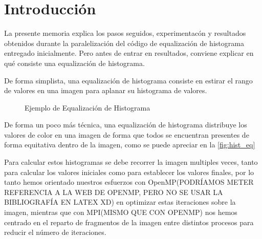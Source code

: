 \documentclass[12pt]{report} %
\begin{document}
\listoftables
\thispagestyle{fancy}

\clearpage
{} %

\chapter{Introducción}
\label{chap:Intro}

La presente memoria explica los pasos seguidos, experimentacón y resultados obtenidos durante la paralelización del código de equalización de histograma entregado inicialmente. Pero antes de entrar en resultados, conviene explicar en qué consiste una equalización de histograma.

De forma simplista, una equalización de histograma consiste en estirar el rango de valores en una imagen para aplanar su histograma de valores.

\begin{figure}[H]
    \caption{Ejemplo de Equalización de Histograma}
    \label{fig:hist_eq}
\end{figure}

De forma un poco más técnica, una equalización de histograma distribuye los valores de color en una imagen de forma que todos se encuentran presentes de forma equitativa dentro de la imagen, como se puede apreciar en la \autoref{fig:hist_eq}

Para calcular estos histogramas se debe recorrer la imagen multiples veces, tanto para calcular los valores iniciales como para establecer los valores finales, por lo tanto hemos orientado nuestros esfuerzos con OpenMP(PODRÍAMOS METER REFERENCIA A LA WEB DE OPENMP, PERO NO SE USAR LA BIBLIOGRAFÍA EN LATEX XD) en optimizar estas iteraciones sobre la imagen, mientras que con MPI(MISMO QUE CON OPENMP) nos hemos centrado en el reparto de fragmentos de la imagen entre distintos procesos para reducir el número de iteraciones.
\end{document}
